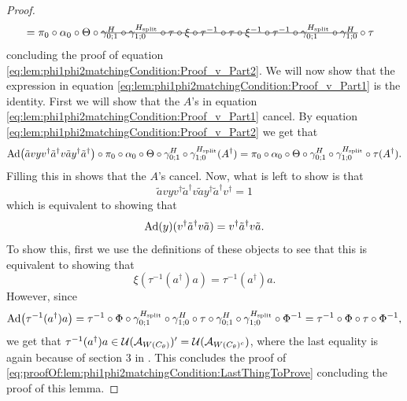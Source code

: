 \documentclass[12pt,a4paper,twoside]{article}
\numberwithin{equation}{section}
\begin{document}
\begin{proof}
\begin{align}
	&=\pi_0\circ\alpha_0\circ\Theta\circ\stkout{\gamma^{H}_{0;1}\circ\gamma^{H_{\text{split}}}_{1;0}\circ\tau\circ\xi\circ\tau^{-1}\circ\tau\circ\xi^{-1}\circ\tau^{-1}\circ\gamma^{H_{\text{split}}}_{0;1}\circ\gamma^H_{1;0}}\circ\tau
	\end{align}
	concluding the proof of equation \eqref{eq:lem:phi1phi2matchingCondition:Proof_v_Part2}. We will now show that the expression in equation \eqref{eq:lem:phi1phi2matchingCondition:Proof_v_Part1} is the identity. First we will show that the $A$'s in equation \eqref{eq:lem:phi1phi2matchingCondition:Proof_v_Part1} cancel. By equation \eqref{eq:lem:phi1phi2matchingCondition:Proof_v_Part2} we get that
	\begin{equation}
		\Ad{\tilde{a}vyv^\dagger\tilde{a}^\dagger v\tilde{a}y^\dagger\tilde{a}^\dagger}\circ\pi_0\circ\alpha_0\circ\Theta\circ\gamma^{H}_{0;1}\circ\gamma^{H_{\text{split}}}_{1;0}(A^\dagger)=\pi_0\circ\alpha_0\circ\Theta\circ\gamma^{H}_{0;1}\circ\gamma^{H_{\text{split}}}_{1;0}\circ\tau(A^\dagger).
	\end{equation}
	Filling this in shows that the $A$'s cancel. Now, what is left to show is that
	\begin{equation}
		\tilde{a}vyv^\dagger\tilde{a}^\dagger v \tilde{a}y^\dagger\tilde{a}^\dagger  v^\dagger=1
	\end{equation}
	which is equivalent to showing that
	\begin{equation}
		\Ad{y}(v^\dagger \tilde{a}^\dagger v \tilde{a})=v^\dagger \tilde{a}^\dagger v \tilde{a}.
	\end{equation}
	To show this, first we use the definitions of these objects to see that this is equivalent to showing that
	\begin{equation}\label{eq:proofOf:lem:phi1phi2matchingCondition:LastThingToProve}
		\xi(\tau^{-1}(a^\dagger)a)=\tau^{-1}(a^\dagger)a.
	\end{equation}
	However, since
	\begin{equation}
		\Ad{\tau^{-1}(a^\dagger)a}=\tau^{-1}\circ\Phi\circ\gamma^{H_{\text{split}}}_{0;1}\circ\gamma^H_{1;0}\circ\tau\circ\gamma^H_{0;1}\circ\gamma^{H_{\text{split}}}_{1;0}\circ\Phi^{-1}=\tau^{-1}\circ\Phi\circ\tau\circ\Phi^{-1},
	\end{equation}
	we get that $\tau^{-1}(a^\dagger)a\in\mathcal U(\mathcal A_{W(C_\theta)})'=\mathcal U(\mathcal A_{W(C_\theta)^c})$, where the last equality is again because of section 3 in \cite{NaScWe_2013}. This concludes the proof of \ref{eq:proofOf:lem:phi1phi2matchingCondition:LastThingToProve} concluding the proof of this lemma.
\end{proof}
\end{document}
